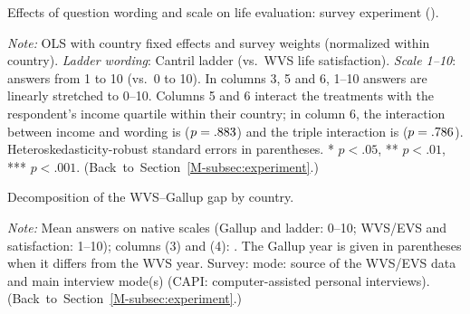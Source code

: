 \documentclass[12pt]{article}
\begin{document}
\begin{table}[htbp]
    \centering
    \begin{adjustbox}{max width=\textwidth}
    
    \end{adjustbox}
    \caption{Effects of question wording and scale on life evaluation: survey experiment (\newsurvey).}\label{tab:fabre_regressions}
    \begin{minipage}{\textwidth}\footnotesize \textit{Note:} OLS with country fixed effects and survey weights (normalized within country). \textit{Ladder wording}: Cantril ladder (vs.\ WVS life satisfaction). \textit{Scale 1--10}: answers from 1 to 10 (vs.\ 0 to 10). In columns 3, 5 and 6, 1--10 answers are linearly stretched to 0--10. Columns 5 and 6 interact the treatments with the respondent's income quartile within their country; in column 6, the interaction between income and wording is \interactionLadderIncomeFull ($p = .883$) and the triple interaction is \tripleInteraction ($p = .786$). Heteroskedasticity-robust standard errors in parentheses. * $p<.05$, ** $p<.01$, *** $p<.001$. \hfill(Back~to~Section~\ref{M-subsec:experiment}.)\end{minipage}
\end{table}

\begin{table}[htbp]
    \centering
    \begin{adjustbox}{max width=\textwidth}
    
    \end{adjustbox}
    \caption{Decomposition of the WVS--Gallup gap by country.}\label{tab:decomposition_country}
    \begin{minipage}{\textwidth}\footnotesize \textit{Note:} Mean answers on native scales (Gallup and ladder: 0--10; WVS/EVS and satisfaction: 1--10); columns (3) and (4): \newsurvey. The Gallup year is given in parentheses when it differs from the WVS year. Survey: mode: source of the WVS/EVS data and main interview mode(s) (CAPI: computer-assisted personal interviews). \hfill(Back~to~Section~\ref{M-subsec:experiment}.)\end{minipage}
\end{table}
\end{document}
